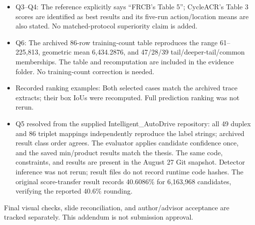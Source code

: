\begin{itemize}
\item Q3--Q4: The reference explicitly says ``FRCB's Table 5''; CycleACR's Table 3 scores are identified as best results and its five-run action/location means are also stated. No matched-protocol superiority claim is added.
\item Q6: The archived 86-row training-count table reproduces the range 61--225,813, geometric mean 6,434.2876, and 47/28/39 tail/deeper-tail/common memberships. The table and recomputation are included in the evidence folder. No training-count correction is needed.
\item Recorded ranking examples: Both selected cases match the archived trace extracts; their box IoUs were recomputed. Full prediction ranking was not rerun.
\item Q5 resolved from the supplied Intelligent\_AutoDrive repository: all 49 duplex and 86 triplet mappings independently reproduce the label strings; archived result class order agrees. The evaluator applies candidate confidence once, and the saved min/product results match the thesis. The same code, constraints, and results are present in the August 27 Git snapshot. Detector inference was not rerun; result files do not record runtime code hashes. The original score-transfer result records 40.6086\% for 6,163,968 candidates, verifying the reported 40.6\% rounding.
\end{itemize}
Final visual checks, slide reconciliation, and author/advisor acceptance are tracked separately. This addendum is not submission approval.
